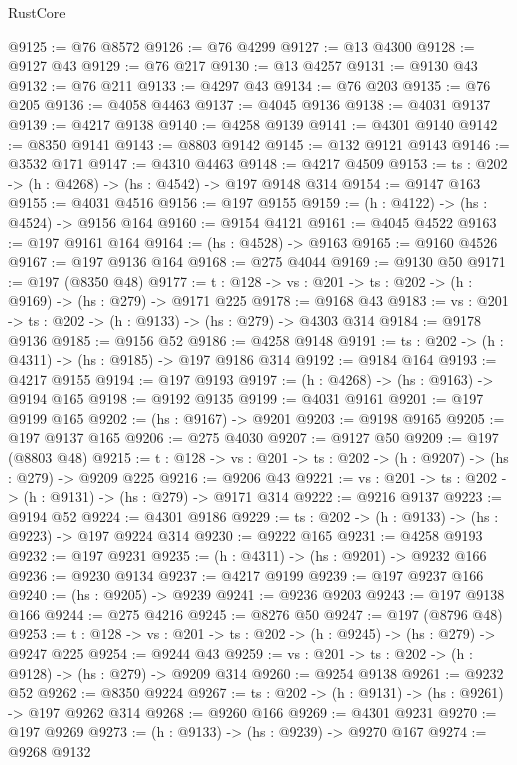 \begin{lexlean}{RustCore}
\begin{coremodule}
@9125 := @76 @8572
@9126 := @76 @4299
@9127 := @13 @4300
@9128 := @9127 @43
@9129 := @76 @217
@9130 := @13 @4257
@9131 := @9130 @43
@9132 := @76 @211
@9133 := @4297 @43
@9134 := @76 @203
@9135 := @76 @205
@9136 := @4058 @4463
@9137 := @4045 @9136
@9138 := @4031 @9137
@9139 := @4217 @9138
@9140 := @4258 @9139
@9141 := @4301 @9140
@9142 := @8350 @9141
@9143 := @8803 @9142
@9145 := @132 @9121 @9143
@9146 := @3532 @171
@9147 := @4310 @4463
@9148 := @4217 @4509
@9153 := {ts : @202} -> (h : @4268) -> (hs : @4542) -> @197 @9148 @314
@9154 := @9147 @163
@9155 := @4031 @4516
@9156 := @197 @9155
@9159 := (h : @4122) -> (hs : @4524) -> @9156 @164
@9160 := @9154 @4121
@9161 := @4045 @4522
@9163 := @197 @9161 @164
@9164 := (hs : @4528) -> @9163
@9165 := @9160 @4526
@9167 := @197 @9136 @164
@9168 := @275 @4044
@9169 := @9130 @50
@9171 := @197 (@8350 @48)
@9177 := {t : @128} -> {vs : @201} -> {ts : @202} -> (h : @9169) -> (hs : @279) -> @9171 @225
@9178 := @9168 @43
@9183 := {vs : @201} -> {ts : @202} -> (h : @9133) -> (hs : @279) -> @4303 @314
@9184 := @9178 @9136
@9185 := @9156 @52
@9186 := @4258 @9148
@9191 := {ts : @202} -> (h : @4311) -> (hs : @9185) -> @197 @9186 @314
@9192 := @9184 @164
@9193 := @4217 @9155
@9194 := @197 @9193
@9197 := (h : @4268) -> (hs : @9163) -> @9194 @165
@9198 := @9192 @9135
@9199 := @4031 @9161
@9201 := @197 @9199 @165
@9202 := (hs : @9167) -> @9201
@9203 := @9198 @9165
@9205 := @197 @9137 @165
@9206 := @275 @4030
@9207 := @9127 @50
@9209 := @197 (@8803 @48)
@9215 := {t : @128} -> {vs : @201} -> {ts : @202} -> (h : @9207) -> (hs : @279) -> @9209 @225
@9216 := @9206 @43
@9221 := {vs : @201} -> {ts : @202} -> (h : @9131) -> (hs : @279) -> @9171 @314
@9222 := @9216 @9137
@9223 := @9194 @52
@9224 := @4301 @9186
@9229 := {ts : @202} -> (h : @9133) -> (hs : @9223) -> @197 @9224 @314
@9230 := @9222 @165
@9231 := @4258 @9193
@9232 := @197 @9231
@9235 := (h : @4311) -> (hs : @9201) -> @9232 @166
@9236 := @9230 @9134
@9237 := @4217 @9199
@9239 := @197 @9237 @166
@9240 := (hs : @9205) -> @9239
@9241 := @9236 @9203
@9243 := @197 @9138 @166
@9244 := @275 @4216
@9245 := @8276 @50
@9247 := @197 (@8796 @48)
@9253 := {t : @128} -> {vs : @201} -> {ts : @202} -> (h : @9245) -> (hs : @279) -> @9247 @225
@9254 := @9244 @43
@9259 := {vs : @201} -> {ts : @202} -> (h : @9128) -> (hs : @279) -> @9209 @314
@9260 := @9254 @9138
@9261 := @9232 @52
@9262 := @8350 @9224
@9267 := {ts : @202} -> (h : @9131) -> (hs : @9261) -> @197 @9262 @314
@9268 := @9260 @166
@9269 := @4301 @9231
@9270 := @197 @9269
@9273 := (h : @9133) -> (hs : @9239) -> @9270 @167
@9274 := @9268 @9132

\end{coremodule}
\end{lexlean}
